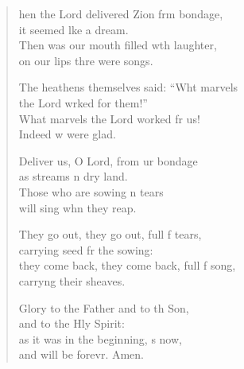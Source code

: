 \settowidth{\versewidth}{they come back, they come back, full of song, *}
\begin{verse}%
  \begin{patverse}
hen the Lord delivered Zion frm bondage,\Med\\
it seemed l\pointup{\i}ke a dream.\\
Then was our mouth filled w\pointup{\i}th laughter,\Med\\
on our lips thre were songs.

The heathens themselves said: “Wht marvels\Med\\
the Lord wrked for them!”\\
What marvels the Lord worked fr us!\Med\\
Indeed w were glad.

Deliver us, O Lord, from ur bondage\Med\\
as streams \pointup{\i}n dry land.\\
Those who are sowing \pointup{\i}n tears\Med\\
will sing whn they reap.

They go out, they go out, full f tears,\Med\\
carrying seed fr the sowing:\\
they come back, they come back, full f song,\Med\\
carry\pointup{\i}ng their sheaves.

Glory to the Father and to th Son,\Med\\
and to the Hly Spirit:\\
as it was in the beginning, \pointup{\i}s now,\Med\\
and will be forevr. Amen. 
  \end{patverse}
\end{verse}
